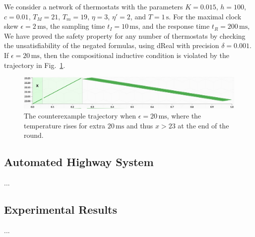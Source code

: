 We consider a network of thermostats with the parameters 
$K = 0.015$, 
$h = 100$,
$c = 0.01$,
$T_M = 21$, 
$T_m = 19$,
$\eta = 3$, $\eta' = 2$,
and $T = 1\,\mathrm{s}$.
For the maximal clock skew $\epsilon = 2\,\mathrm{ms}$,
the sampling time $t_I = 10\,\mathrm{ms}$,
and the response time $t_R = 200\,\mathrm{ms}$,
We have proved the safety property for any number of thermostats 
by checking the unsatisfiability of the negated formulas,
 using \textsf{dReal} with precision $\delta = 0.001$.
%
If $\epsilon = 20\,\mathrm{ms}$,
then the compositional inductive condition is violated by the trajectory in Fig.~\ref{fig:thermo-error}.


\begin{figure}
\centering
\includegraphics[width=\columnwidth]{thermo-error.png}    
\caption{The counterexample trajectory when $\epsilon = 20\,\mathrm{ms}$,
where the temperature  rises for extra $20\,\mathrm{ms}$ and thus $x > 23$ at the end of the round.} \label{fig:thermo-error}
\end{figure}


\subsection{Automated Highway System}

...





\subsection{Experimental Results}

...

